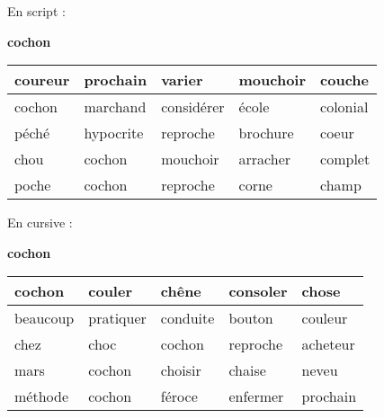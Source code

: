 \documentclass[a4paper, 11pt,oneside, fleqn]{article}
\begin{document}
\begin{onehalfspace}
\large\noindent En script :
\begin{center} {\huge \textbf{cochon}}
\vspace{0.25cm}\\
\begin{tabulary}{17cm}{|h|h|h|h|h|}
\hline
coureur & prochain & varier & mouchoir & couche \\
\hline
cochon & marchand & considérer & école & colonial \\
\hline
péché & hypocrite & reproche & brochure & coeur \\
\hline
chou & cochon & mouchoir & arracher & complet \\
\hline
poche & cochon & reproche & corne & champ \\
\hline
\end{tabulary}
\end{center}
\vspace{0.5cm}

\large\noindent En cursive :
\begin{center}
{\huge \textbf {{\cursive cochon}}}
\vspace{0.25cm}\\
\begin{tabulary}{17cm}{|i|i|i|i|i|}
\hline
cochon & couler & chêne & consoler & chose \\
\hline
beaucoup & pratiquer & conduite & bouton & couleur \\
\hline
chez & choc & cochon & reproche & acheteur \\
\hline
mars & cochon & choisir & chaise & neveu \\
\hline
méthode & cochon & féroce & enfermer & prochain \\
\hline
\end{tabulary}
\end{center}

\end{onehalfspace}
\end{document}
